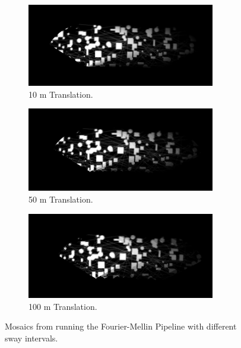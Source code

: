 \begin{figure}[H]
    \centering
    \begin{subfigure}[b]{\textwidth}
        \centering
        \includegraphics[width=0.9\textwidth]{figures/results/Translation-Combined/FMT-0.png}
        \caption{10 m Translation.}
    \end{subfigure}
    \hfill
    \begin{subfigure}[b]{\textwidth}
        \centering
        \includegraphics[width=0.9\textwidth]{figures/results/Translation-Combined/FMT-4.png}
        \caption{50 m Translation.}
    \end{subfigure}
    \hfill
    \begin{subfigure}[b]{\textwidth}
        \centering
        \includegraphics[width=0.9\textwidth]{figures/results/Translation-Combined/FMT-9.png}
        \caption{100 m Translation.}
    \end{subfigure}
    \hfill
    \caption{Mosaics from running the Fourier-Mellin Pipeline with different sway intervals.}
    \label{fig:fmtranslationmosaic}
\end{figure}





